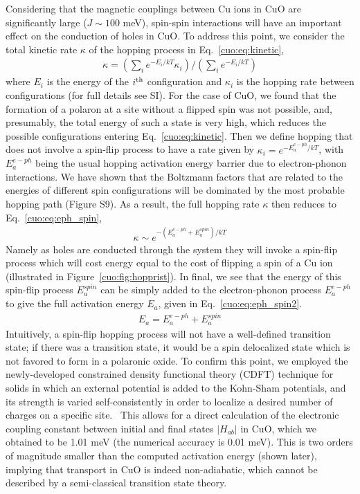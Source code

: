 Considering that the magnetic couplings between Cu ions in CuO are significantly large ($J\sim 100$ meV), spin-spin interactions will have an important effect on the conduction of holes in CuO. To address this point, we consider the total kinetic rate $\kappa$ of the hopping process in Eq.~\ref{cuo:eq:kinetic},
\begin{align}
    \kappa = \left( \sum_i e^{-E_i/kT} \kappa_i \right) / \left( \sum_i e^{-E_i/kT} \right)
    \label{cuo:eq:kinetic}
\end{align}
where $E_i$ is the energy of the $i^{\rm th}$ configuration and $\kappa_i$ is the hopping rate between configurations (for full details see SI). For the case of CuO, we found that the formation of a polaron at a site without a flipped spin was not possible, and, presumably, the total energy of such a state is very high, which reduces the possible configurations entering Eq.~\ref{cuo:eq:kinetic}. Then we define hopping that does not involve a spin-flip process to have a rate given by $\kappa_i=e^{-E_a^{e-ph}/kT}$, with $E_a^{e-ph}$ being the usual hopping activation energy barrier due to electron-phonon interactions. We have shown that the Boltzmann factors that are related to the energies of different spin configurations will be dominated by the most probable hopping path (Figure S9). As a result, the full hopping rate $\kappa$ then reduces to Eq.~\ref{cuo:eq:eph_spin},
\begin{align}
    \kappa \sim e^{-(E_a^{e-ph}+E_a^{spin})/kT}
    \label{cuo:eq:eph_spin}
\end{align}
Namely as holes are conducted through the system they will invoke a spin-flip process which will cost energy equal to the cost of flipping a spin of a Cu ion (illustrated in Figure~\ref{cuo:fig:hopprist}). In final, we see that the energy of this spin-flip process $E_a^{spin}$ can be simply added to the electron-phonon process $E_a^{e-ph}$ to give the full activation energy $E_a$, given in Eq.~\ref{cuo:eq:eph_spin2}.
\begin{align}
    E_a = E_a^{e-ph}+E_a^{spin}
    \label{cuo:eq:eph_spin2}
\end{align}
Intuitively, a spin-flip hopping process will not have a well-defined transition state; if there was a transition state, it would be a spin delocalized state which is not favored to form in a polaronic oxide. To confirm this point, we employed the newly-developed constrained density functional theory (CDFT) technique for solids in which an external potential is added to the Kohn-Sham potentials, and its strength is varied self-consistently in order to localize a desired number of charges on a specific site.~\cite{goldey2017charge,kaduk2012constrained} This allows for a direct calculation of the electronic coupling constant between initial and final states $|H_{ab}|$ in CuO, which we obtained to be 1.01 meV (the numerical accuracy is 0.01 meV). This is two orders of magnitude smaller than the computed activation energy (shown later), implying that transport in CuO is indeed non-adiabatic, which cannot be described by a semi-classical transition state theory.


